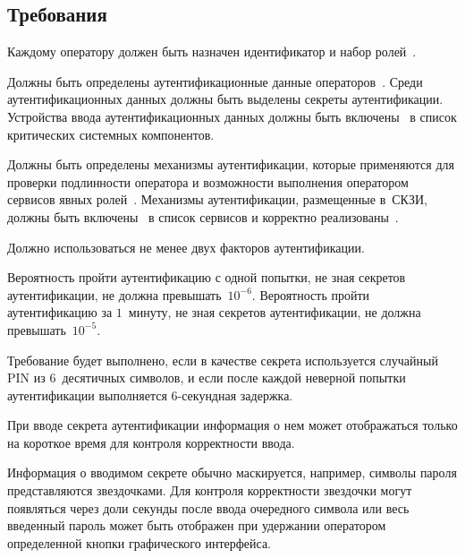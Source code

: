 \subsection{Требования}\label{IA.Reqs}

\label{R.IA.Id} %
Каждому оператору должен быть назначен идентификатор и набор 
ролей~.

\label{R.IA.AuthData} %
Должны быть определены аутентификационные данные операторов~.
% 
Среди аутентификационных данных должны быть выделены 
секреты аутентификации.
%
Устройства ввода аутентификационных данных должны быть
включены~ в список критических системных компонентов. 

\label{R.IA.Auth} %
Должны быть определены механизмы аутентификации, которые применяются для
проверки подлинности оператора и возможности выполнения оператором сервисов
явных ролей~.
%
Механизмы аутентификации, размещенные в~СКЗИ, должны быть
включены~ в список сервисов и корректно
реализованы~.

\label{R.IA.2FA} %
Должно использоваться не менее двух факторов аутентификации.

\label{R.IA.AuthStrength} %
Вероятность пройти аутентификацию с одной попытки, не зная секретов
аутентификации, не должна превышать~$10^{-6}$.
%
Вероятность пройти аутентификацию за $1$~минуту, не зная секретов 
аутентификации, не должна превышать~$10^{-5}$.

\begin{note*}
Требование будет выполнено, если в качестве секрета используется 
случайный PIN из $6$~десятичных символов, и если после каждой неверной попытки 
аутентификации выполняется $6$-секундная задержка.
\end{note*}

\label{R.IA.PwdMask} %
При вводе секрета аутентификации информация о нем может отображаться только на 
короткое время для контроля корректности ввода.

\begin{note*}
Информация о вводимом секрете обычно маскируется, например, символы 
пароля представляются звездочками. Для контроля корректности звездочки могут 
появляться через доли секунды после ввода очередного символа или весь 
введенный пароль может быть отображен при удержании оператором определенной 
кнопки графического интерфейса.
\end{note*}

